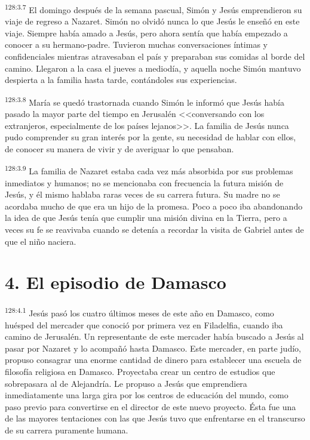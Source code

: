 \par 
\textsuperscript{128:3.7} El domingo después de la semana pascual, Simón y Jesús emprendieron su viaje de regreso a Nazaret. Simón no olvidó nunca lo que Jesús le enseñó en este viaje. Siempre había amado a Jesús, pero ahora sentía que había empezado a conocer a su hermano-padre. Tuvieron muchas conversaciones íntimas y confidenciales mientras atravesaban el país y preparaban sus comidas al borde del camino. Llegaron a la casa el jueves a mediodía, y aquella noche Simón mantuvo despierta a la familia hasta tarde, contándoles sus experiencias.

\par 
\textsuperscript{128:3.8} María se quedó trastornada cuando Simón le informó que Jesús había pasado la mayor parte del tiempo en Jerusalén <<conversando con los extranjeros, especialmente de los países lejanos>>. La familia de Jesús nunca pudo comprender su gran interés por la gente, su necesidad de hablar con ellos, de conocer su manera de vivir y de averiguar lo que pensaban.

\par 
\textsuperscript{128:3.9} La familia de Nazaret estaba cada vez más absorbida por sus problemas inmediatos y humanos; no se mencionaba con frecuencia la futura misión de Jesús, y él mismo hablaba raras veces de su carrera futura. Su madre no se acordaba mucho de que era un hijo de la promesa. Poco a poco iba abandonando la idea de que Jesús tenía que cumplir una misión divina en la Tierra, pero a veces su fe se reavivaba cuando se detenía a recordar la visita de Gabriel antes de que el niño naciera.

\section*{4. El episodio de Damasco}
\par 
\textsuperscript{128:4.1} Jesús pasó los cuatro últimos meses de este año en Damasco, como huésped del mercader que conoció por primera vez en Filadelfia, cuando iba camino de Jerusalén. Un representante de este mercader había buscado a Jesús al pasar por Nazaret y lo acompañó hasta Damasco. Este mercader, en parte judío, propuso consagrar una enorme cantidad de dinero para establecer una escuela de filosofía religiosa en Damasco. Proyectaba crear un centro de estudios que sobrepasara al de Alejandría. Le propuso a Jesús que emprendiera inmediatamente una larga gira por los centros de educación del mundo, como paso previo para convertirse en el director de este nuevo proyecto. Ésta fue una de las mayores tentaciones con las que Jesús tuvo que enfrentarse en el transcurso de su carrera puramente humana.

